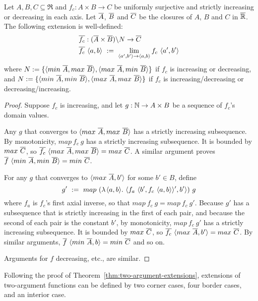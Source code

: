 \documentclass[preprint]{sigplanconf}
\begin{document}
\begin{theorem}
\label{thm:two-argument-extensions}
Let $A,B,C \subseteq \Re$ and $f_c : A \times B \to C$ be uniformly surjective and strictly increasing or decreasing in each axis.
Let $\cl{A}$, $\cl{B}$ and $\cl{C}$ be the closures of $A$, $B$ and $C$ in $\cl{\Re}$.
The following extension is well-defined:
\begin{equation}
\begin{aligned}
	&\cl{f_c} : (\cl{A} \times \cl{B}) \w N \to \cl{C} \\
	&\cl{f_c}~\pair{a,b}\ :=\ \lim_{\pair{a',b'} \to \pair{a,b}} f_c~\pair{a',b'}
\end{aligned}
\end{equation}
where $N := \set{\pair{min~\cl{A},max~\cl{B}},\pair{max~\cl{A},min~\cl{B}}}$ if $f_c$ is increasing or decreasing, and
$N := \set{\pair{min~\cl{A},min~\cl{B}},\pair{max~\cl{A},max~\cl{B}}}$ if $f_c$ is increasing/decreasing or decreasing/increasing.
\end{theorem}
\begin{proof}
Suppose $f_c$ is increasing, and let $g : \mathbb{N} \to A \times B$ be a sequence of $f_c$'s domain values.

Any $g$ that converges to $\pair{max~\cl{A},max~\cl{B}}$ has a strictly increasing subsequence.
By monotonicity, $map~f_c~g$ has a strictly increasing subsequence.
It is bounded by $max~\cl{C}$, so $\cl{f_c}~\pair{max~\cl{A},max~\cl{B}} = max~\cl{C}$.
A similar argument proves $\cl{f}~\pair{min~\cl{A},min~\cl{B}} = min~\cl{C}$.

For any $g$ that converges to $\pair{max~\cl{A},b'}$ for some $b' \in B$, define
\begin{equation}
	g'\ :=\ map~(\fun{\pair{a,b}}\pair{f_a~\pair{b',f_c~\pair{a,b}}',b'})~g
\end{equation}
where $f_a$ is $f_c$'s first axial inverse, so that $map~f_c~g = map~f_c~g'$.
Because $g'$ has a subsequence that is strictly increasing in the first of each pair, and because the second of each pair is the constant $b'$, by monotonicity, $map~f_c~g'$ has a strictly increasing subsequence.
It is bounded by $max~\cl{C}$, so $\cl{f_c}~\pair{max~\cl{A},b'} = max~\cl{C}$.
By similar arguments, $\cl{f}~\pair{min~\cl{A},b} = min~\cl{C}$ and so on.

Arguments for $f$ decreasing, etc., are similar.
\end{proof}

Following the proof of Theorem~\ref{thm:two-argument-extensions}, extensions of two-argument functions can be defined by two corner cases, four border cases, and an interior case.
\end{document}
